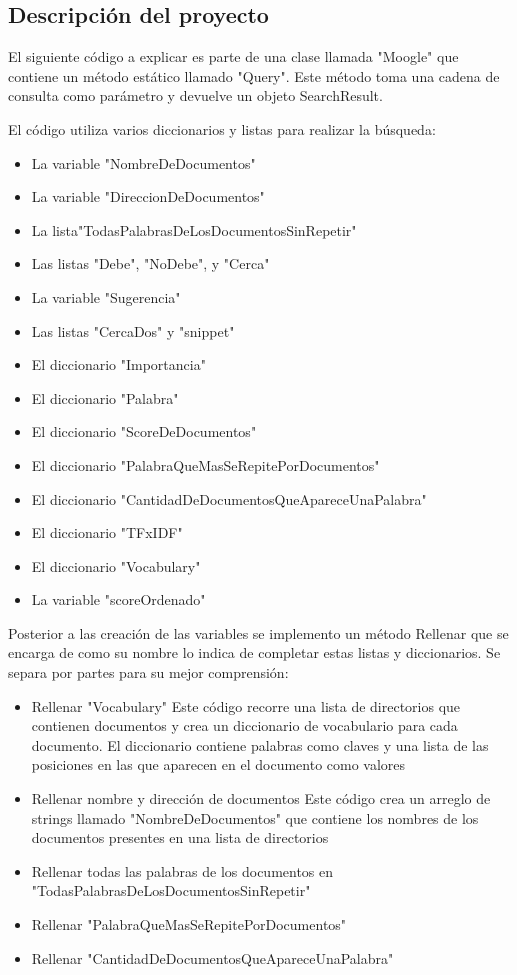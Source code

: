 \subsection{Descripción del proyecto}
\begin{frame}
    El siguiente código a explicar es parte de una clase llamada "Moogle" que 
contiene un método estático llamado "Query". Este método toma una cadena 
de consulta como parámetro y devuelve un objeto SearchResult. 
\end{frame}
\begin {frame}
El código utiliza varios diccionarios y listas para realizar la búsqueda: 
\begin {itemize}
\item La variable "NombreDeDocumentos" 
\item La variable "DireccionDeDocumentos"
\item La lista"TodasPalabrasDeLosDocumentosSinRepetir"
\item Las listas "Debe", "NoDebe", y "Cerca"
\item La variable "Sugerencia" 
\item Las listas "CercaDos" y "snippet" 
\item El diccionario "Importancia"
\item El diccionario "Palabra"
\item El diccionario "ScoreDeDocumentos" 
\item El diccionario "PalabraQueMasSeRepitePorDocumentos"
\item El diccionario "CantidadDeDocumentosQueApareceUnaPalabra" 
\item El diccionario "TFxIDF"
\item El diccionario "Vocabulary"
\item La variable "scoreOrdenado"
\end {itemize}
\end{frame}
\begin{frame}
Posterior a las creación de las variables se implemento un método Rellenar que 
se encarga de como su nombre lo indica de completar estas listas y 
diccionarios. Se separa por partes para su mejor comprensión: 
\begin{itemize}
    \item Rellenar "Vocabulary" 
    Este código recorre una lista de directorios que contienen documentos y crea 
    un diccionario de vocabulario para cada documento. El diccionario contiene 
    palabras como claves y una lista de las posiciones en las que aparecen en el 
    documento como valores
    \item Rellenar nombre y dirección de documentos
     Este código crea un arreglo de strings llamado "NombreDeDocumentos" que 
    contiene los nombres de los documentos presentes en una lista de directorios
    \item Rellenar todas las palabras de los documentos en 
    "TodasPalabrasDeLosDocumentosSinRepetir"
    \item Rellenar "PalabraQueMasSeRepitePorDocumentos" 
    \item Rellenar "CantidadDeDocumentosQueApareceUnaPalabra" 
   
\end{itemize}
\end{frame}
